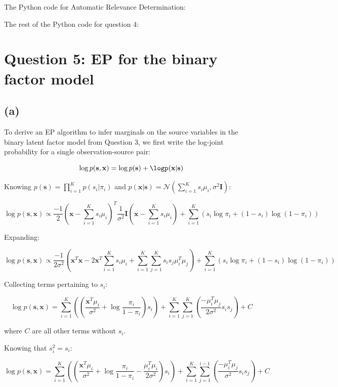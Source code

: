 \documentclass[12pt]{article}
\begin{document}
{\newpage
The Python code for Automatic Relevance Determination:



\newpage
The rest of the Python code for question 4:



\newpage
\section*{Question 5: EP for the binary factor model}

\subsection*{(a)}

To derive an EP algorithm to infer marginals on the source variables in the binary latent factor model from Question 3, we first write the log-joint probability for a single observation-source pair:

\[\log p(\textbf{s}, \textbf{x}) = \log p(\textbf{s}) + \logp(\textbf{x}|\textbf{s})\]

Knowing $p(\textbf{s}) = \prod_{i=1}^{K}p(s_i| \pi_i)$ and $p(\textbf{x}|\textbf{s}) = \mathcal{N}(\sum_{i=1}^{K} s_i \mu_i, \sigma^2 \textbf{I})$:

\[\log p(\textbf{s}, \textbf{x})  \propto \frac{-1}{2}\left( \textbf{x} - \sum_{i=1}^{K}s_i \mu_i\right)^T \frac{1}{\sigma^2} \textbf{I} \left( \textbf{x} - \sum_{i=1}^{K} s_i \mu_i\right) + \sum_{i=1}^{K} \left(s_i \log\pi_i + (1-s_i)\log(1-\pi_i)\right)\]

Expanding:

\[\log p(\textbf{s}, \textbf{x})  \propto \frac{-1}{2\sigma^2} \left( \textbf{x}^T\textbf{x} - 2\textbf{x}^T\sum_{i=1}^{K}s_i \mu_i + \sum_{i=1}^{K}\sum_{j=1}^{K}s_i s_j \mu_i^T \mu_j\right) + \sum_{i=1}^{K} \left(s_i \log\pi_i + (1-s_i)\log(1-\pi_i)\right)\]

Collecting terms pertaining to $s_i$:

\[\log p(\textbf{s}, \textbf{x})  =    \sum_{i=1}^{K} \left(\left(\frac{\textbf{x}^T \mu_i}{\sigma^2} +\log\frac{\pi_i}{1-\pi_i} \right) s_i\right) + \sum_{i=1}^{K}\sum_{j=1}^{K}\left( \frac{ - \mu_i^T \mu_j}{2\sigma^2} s_i s_j \right) + C\]

where $C$ are all other terms without $s_i$.

Knowing that $s_i^2= s_i$:

\[\log p(\textbf{s}, \textbf{x})  =    \sum_{i=1}^{K} \left(\left(\frac{\textbf{x}^T \mu_i}{\sigma^2} +\log\frac{\pi_i}{1-\pi_i} - \frac{\mu_i^T \mu_i}{2\sigma^2} \right) s_i\right) + \sum_{i=1}^{K}\sum_{j=1}^{i-1}\left( \frac{ - \mu_i^T \mu_j}{\sigma^2} s_i s_j \right) + C\]


}
\end{document}
